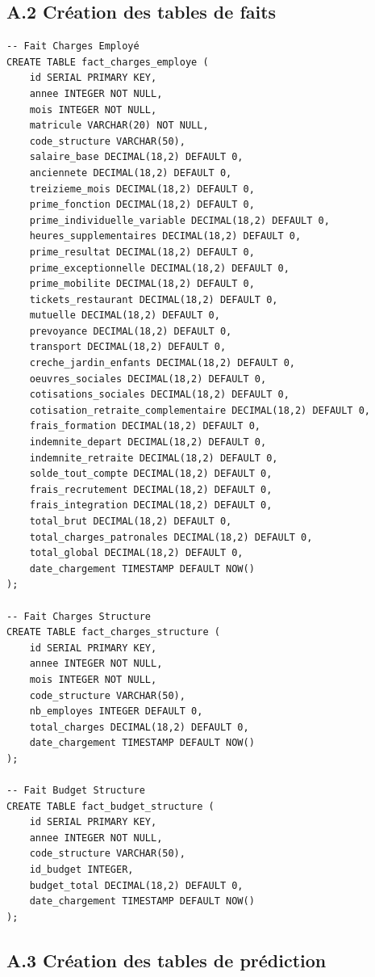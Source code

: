 \subsection*{A.2 Création des tables de faits}

\begin{verbatim}
-- Fait Charges Employé
CREATE TABLE fact_charges_employe (
    id SERIAL PRIMARY KEY,
    annee INTEGER NOT NULL,
    mois INTEGER NOT NULL,
    matricule VARCHAR(20) NOT NULL,
    code_structure VARCHAR(50),
    salaire_base DECIMAL(18,2) DEFAULT 0,
    anciennete DECIMAL(18,2) DEFAULT 0,
    treizieme_mois DECIMAL(18,2) DEFAULT 0,
    prime_fonction DECIMAL(18,2) DEFAULT 0,
    prime_individuelle_variable DECIMAL(18,2) DEFAULT 0,
    heures_supplementaires DECIMAL(18,2) DEFAULT 0,
    prime_resultat DECIMAL(18,2) DEFAULT 0,
    prime_exceptionnelle DECIMAL(18,2) DEFAULT 0,
    prime_mobilite DECIMAL(18,2) DEFAULT 0,
    tickets_restaurant DECIMAL(18,2) DEFAULT 0,
    mutuelle DECIMAL(18,2) DEFAULT 0,
    prevoyance DECIMAL(18,2) DEFAULT 0,
    transport DECIMAL(18,2) DEFAULT 0,
    creche_jardin_enfants DECIMAL(18,2) DEFAULT 0,
    oeuvres_sociales DECIMAL(18,2) DEFAULT 0,
    cotisations_sociales DECIMAL(18,2) DEFAULT 0,
    cotisation_retraite_complementaire DECIMAL(18,2) DEFAULT 0,
    frais_formation DECIMAL(18,2) DEFAULT 0,
    indemnite_depart DECIMAL(18,2) DEFAULT 0,
    indemnite_retraite DECIMAL(18,2) DEFAULT 0,
    solde_tout_compte DECIMAL(18,2) DEFAULT 0,
    frais_recrutement DECIMAL(18,2) DEFAULT 0,
    frais_integration DECIMAL(18,2) DEFAULT 0,
    total_brut DECIMAL(18,2) DEFAULT 0,
    total_charges_patronales DECIMAL(18,2) DEFAULT 0,
    total_global DECIMAL(18,2) DEFAULT 0,
    date_chargement TIMESTAMP DEFAULT NOW()
);

-- Fait Charges Structure
CREATE TABLE fact_charges_structure (
    id SERIAL PRIMARY KEY,
    annee INTEGER NOT NULL,
    mois INTEGER NOT NULL,
    code_structure VARCHAR(50),
    nb_employes INTEGER DEFAULT 0,
    total_charges DECIMAL(18,2) DEFAULT 0,
    date_chargement TIMESTAMP DEFAULT NOW()
);

-- Fait Budget Structure
CREATE TABLE fact_budget_structure (
    id SERIAL PRIMARY KEY,
    annee INTEGER NOT NULL,
    code_structure VARCHAR(50),
    id_budget INTEGER,
    budget_total DECIMAL(18,2) DEFAULT 0,
    date_chargement TIMESTAMP DEFAULT NOW()
);
\end{verbatim}

\subsection*{A.3 Création des tables de prédiction}

